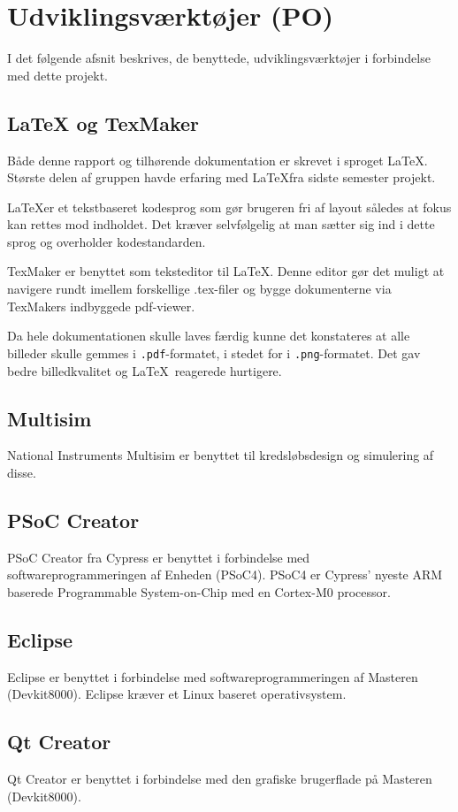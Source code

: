 
\chapter{Udviklingsværktøjer (PO)} \label{head:udviklingsvaektoejer}
I det følgende afsnit beskrives, de benyttede, udviklingsværktøjer i forbindelse med dette projekt. 

\section{LaTeX og TexMaker}
Både denne rapport og tilhørende dokumentation er skrevet i sproget \LaTeX. Største delen af gruppen havde erfaring med \LaTeX fra sidste semester projekt. 

\LaTeX er et tekstbaseret kodesprog som gør brugeren fri af layout således at fokus kan rettes mod indholdet. Det kræver selvfølgelig at man sætter sig ind i dette sprog og overholder kodestandarden. 

TexMaker er benyttet som teksteditor til \LaTeX. Denne editor gør det muligt at navigere rundt imellem forskellige .tex-filer og bygge dokumenterne via TexMakers indbyggede pdf-viewer.

Da hele dokumentationen skulle laves færdig  kunne det konstateres at alle billeder skulle gemmes i \verb+.pdf+-formatet, i stedet for i \verb+.png+-formatet. Det gav bedre billedkvalitet og \LaTeX\ reagerede hurtigere.

\section{Multisim}
National Instruments Multisim er benyttet til kredsløbsdesign og simulering af disse. 

\section{PSoC Creator}
PSoC Creator fra Cypress er benyttet i forbindelse med softwareprogrammeringen af Enheden (PSoC4). PSoC4 er Cypress' nyeste ARM baserede Programmable System-on-Chip med en Cortex-M0 processor. 

\section{Eclipse}
Eclipse er benyttet i forbindelse med softwareprogrammeringen af Masteren (Devkit8000). Eclipse kræver et Linux baseret operativsystem.

\section{Qt Creator}
Qt Creator er benyttet i forbindelse med den grafiske brugerflade på Masteren (Devkit8000).

